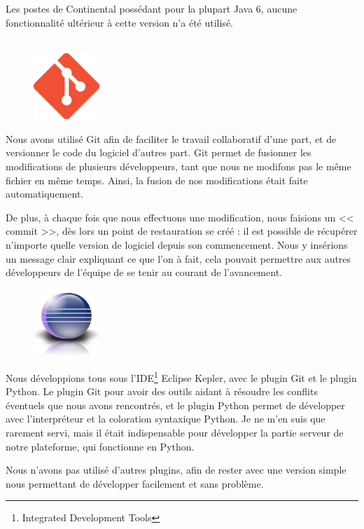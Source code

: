 Les postes de Continental possédant pour la plupart Java 6, aucune fonctionnalité ultérieur à cette version n'a été utilisé.\\~

\begin{figure}
	\includegraphics[width=2.5cm]{contents/images/logoGit.png}
\end{figure}
Nous avons utilisé Git afin de faciliter le travail collaboratif d'une part, et de versionner le code du logiciel d'autres part. Git permet de fusionner les modifications de plusieurs développeurs, tant que nous ne modifons pas le même fichier en même temps. Ainsi, la fusion de nos modifications était faite automatiquement. 

De plus, à chaque fois que nous effectuons une modification, nous faisions un << commit >>, dès lors un point de restauration se créé : il est possible de récupérer n'importe quelle version de logiciel depuis son commencement. Nous y insérions un message clair expliquant ce que l'on à fait, cela pouvait permettre aux autres développeurs de l'équipe de se tenir au courant de l'avancement.

\begin{figure}
	\includegraphics[width=2.5cm]{contents/images/logoEclipse.png}
\end{figure}
Nous développions tous sous l'IDE\footnote{Integrated Development Tools} Eclipse Kepler, avec le plugin Git et le plugin Python. Le plugin Git pour avoir des outils aidant à résoudre les conflits éventuels que nous avons rencontrés, et le plugin Python permet de développer avec l'interpréteur et la coloration syntaxique Python. Je ne m'en suis que rarement servi, mais il était indispensable pour développer la partie serveur de notre plateforme, qui fonctionne en Python.

Nous n'avons pas utilisé d'autres plugins, afin de rester avec une version simple nous permettant de développer facilement et sans problème.

